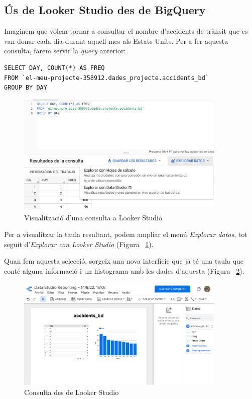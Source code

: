 \documentclass[12pt,longbibliography]{article}
\theoremstyle{definition}
\theoremstyle{remark}
\begin{document}
\subsection{Ús de Looker Studio des de BigQuery}

Imaginem que volem tornar a consultar el nombre d'accidents de trànsit que es van donar cada dia durant aquell mes als Estats Units. Per a fer aquesta consulta, farem servir la \textit{query} anterior:

\begin{verbatim}
SELECT DAY, COUNT(*) AS FREQ
FROM `el-meu-projecte-358912.dades_projecte.accidents_bd`
GROUP BY DAY
\end{verbatim}


\begin{figure}[h!]
\begin{center}
\includegraphics[width=10cm]{bq26}
\end{center}
\caption{Visualització d'una consulta a Looker Studio}
\label{fig:bq26}
\end{figure}


Per a visualitzar la taula resultant, podem ampliar el menú \textit{Explorar datos}, tot seguit d'\textit{Explorar con Looker Studio} (Figura ~\ref{fig:bq26}).


Quan fem aquesta selecció, sorgeix una nova interfície que ja té una taula que conté alguna informació i un histograma amb les dades d'aquesta (Figura ~\ref{fig:bq27}).

\begin{figure}[h!]
\begin{center}
\includegraphics[width=10cm]{bq27}
\end{center}
\caption{Consulta des de Looker Studio}
\label{fig:bq27}
\end{figure}
\end{document}
